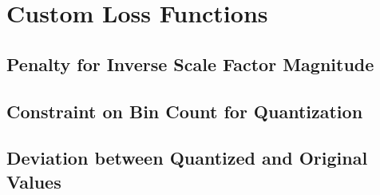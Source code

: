 \section{Custom Loss Functions}
\label{sec:customloss}

\subsection{Penalty for Inverse Scale Factor Magnitude} 
\label{subsec:scaleinverse}

\subsection{Constraint on Bin Count for Quantization}
\label{subsec:maxbin}

\subsection{Deviation between Quantized and Original Values}
\label{subsec:difference}